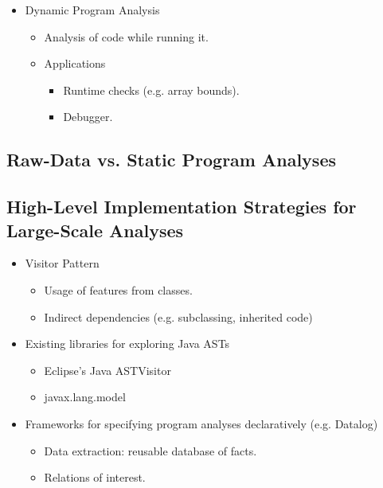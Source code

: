 \documentclass{article}
\begin{document}
\begin{itemize}
\begin{itemize}
\begin{itemize}
        \end{itemize}
    \end{itemize}
    \item Dynamic Program Analysis
    \begin{itemize}
        \item Analysis of code while running it.
        \item Applications
        \begin{itemize}
            \item Runtime checks (e.g. array bounds).
            \item Debugger.
        \end{itemize}
    \end{itemize}
\end{itemize}

\subsection{Raw-Data vs. Static Program Analyses}

\subsection{High-Level Implementation Strategies for Large-Scale Analyses}

\begin{itemize}
    \item Visitor Pattern
    \begin{itemize}
        \item Usage of features from classes.
        \item Indirect dependencies (e.g. subclassing, inherited code)
    \end{itemize}
    \item Existing libraries for exploring Java ASTs
    \begin{itemize}
        \item Eclipse's Java ASTVisitor
        \item javax.lang.model
    \end{itemize}
    \item Frameworks for specifying program analyses declaratively (e.g. Datalog)
    \begin{itemize}
        \item Data extraction: reusable database of facts.
        \item Relations of interest.
    \end{itemize}
\end{itemize}
\end{document}
